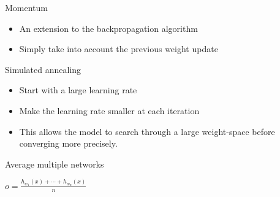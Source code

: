 \begin{frame}[c]{Momentum}
  \begin{itemize}
    \item An extension to the backpropagation algorithm
    \item Simply take into account the previous weight update
  \end{itemize}
\end{frame}

\begin{frame}{Simulated annealing}
\begin{itemize}
  \item Start with a large learning rate
  \item Make the learning rate smaller at each iteration
  \item This allows the model to search through a large weight-space before
  converging more precisely.
\end{itemize}
\end{frame}

\begin{frame}{Average multiple networks}
\begin{center}
  \Large{$o = \frac{h_{w_1}(x) + \cdots + h_{w_n}(x)}{n}$}
\end{center}
\end{frame}

